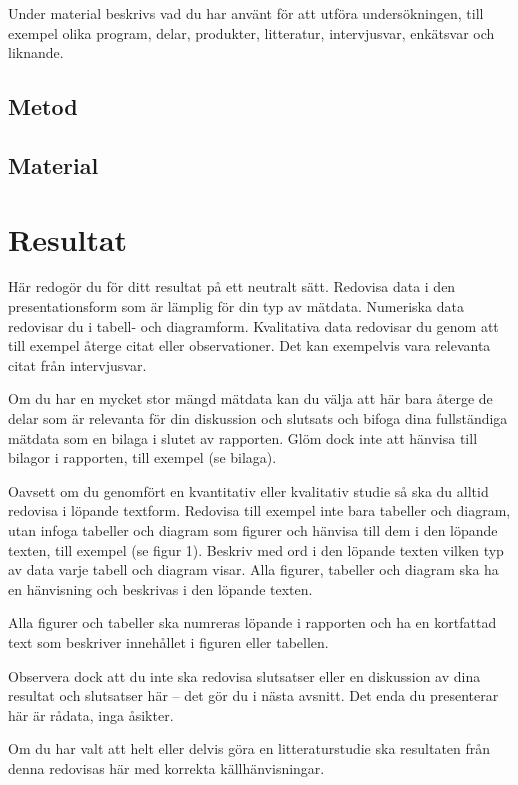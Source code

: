 \documentclass{article}
\begin{document}
Under material beskrivs vad du har använt för att utföra undersökningen, till exempel olika program, delar, produkter, litteratur, intervjusvar, enkätsvar och liknande.

\subsection{Metod}


\subsection{Material}


\section{Resultat}
Här redogör du för ditt resultat på ett neutralt sätt. Redovisa data i den presentationsform som är lämplig för din typ av mätdata. Numeriska data redovisar du i tabell- och diagramform. Kvalitativa data redovisar du genom att till exempel återge citat eller observationer. Det kan exempelvis vara relevanta citat från intervjusvar.

Om du har en mycket stor mängd mätdata kan du välja att här bara återge de delar som är relevanta för din diskussion och slutsats och bifoga dina fullständiga mätdata som en bilaga i slutet av rapporten. Glöm dock inte att hänvisa till bilagor i rapporten, till exempel (se bilaga).

Oavsett om du genomfört en kvantitativ eller kvalitativ studie så ska du alltid redovisa i löpande textform. Redovisa till exempel inte bara tabeller och diagram, utan infoga tabeller och diagram som figurer och hänvisa till dem i den löpande texten, till exempel (se figur 1). Beskriv med ord i den löpande texten vilken typ av data varje tabell och diagram visar. Alla figurer, tabeller och diagram ska ha en hänvisning och beskrivas i den löpande texten.

Alla figurer och tabeller ska numreras löpande i rapporten och ha en kortfattad text som beskriver innehållet i figuren eller tabellen.

Observera dock att du inte ska redovisa slutsatser eller en diskussion av dina resultat och slutsatser här – det gör du i nästa avsnitt. Det enda du presenterar här är rådata, inga åsikter.

Om du har valt att helt eller delvis göra en litteraturstudie ska resultaten från denna redovisas här med korrekta källhänvisningar.
\end{document}
